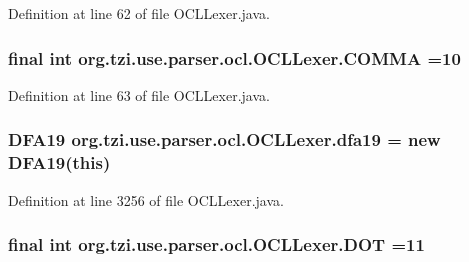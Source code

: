 Definition at line 62 of file O\-C\-L\-Lexer.\-java.

\hypertarget{classorg_1_1tzi_1_1use_1_1parser_1_1ocl_1_1_o_c_l_lexer_a3e2706d35db278759e2d354d1f2cbe25}{
\subsubsection[{C\-O\-M\-M\-A}]{\setlength{\rightskip}{0pt plus 5cm}final int org.\-tzi.\-use.\-parser.\-ocl.\-O\-C\-L\-Lexer.\-C\-O\-M\-M\-A =10\hspace{0.3cm}{\ttfamily [static]}}}\label{classorg_1_1tzi_1_1use_1_1parser_1_1ocl_1_1_o_c_l_lexer_a3e2706d35db278759e2d354d1f2cbe25}


Definition at line 63 of file O\-C\-L\-Lexer.\-java.

\hypertarget{classorg_1_1tzi_1_1use_1_1parser_1_1ocl_1_1_o_c_l_lexer_a3d4110ab4003cc4589234796e18d2789}{
\subsubsection[{dfa19}]{\setlength{\rightskip}{0pt plus 5cm}D\-F\-A19 org.\-tzi.\-use.\-parser.\-ocl.\-O\-C\-L\-Lexer.\-dfa19 = new D\-F\-A19(this)\hspace{0.3cm}{\ttfamily [protected]}}}\label{classorg_1_1tzi_1_1use_1_1parser_1_1ocl_1_1_o_c_l_lexer_a3d4110ab4003cc4589234796e18d2789}


Definition at line 3256 of file O\-C\-L\-Lexer.\-java.

\hypertarget{classorg_1_1tzi_1_1use_1_1parser_1_1ocl_1_1_o_c_l_lexer_a599f0716e06583f9e03ff3e166b466a8}{
\subsubsection[{D\-O\-T}]{\setlength{\rightskip}{0pt plus 5cm}final int org.\-tzi.\-use.\-parser.\-ocl.\-O\-C\-L\-Lexer.\-D\-O\-T =11\hspace{0.3cm}{\ttfamily [static]}}}\label{classorg_1_1tzi_1_1use_1_1parser_1_1ocl_1_1_o_c_l_lexer_a599f0716e06583f9e03ff3e166b466a8}


